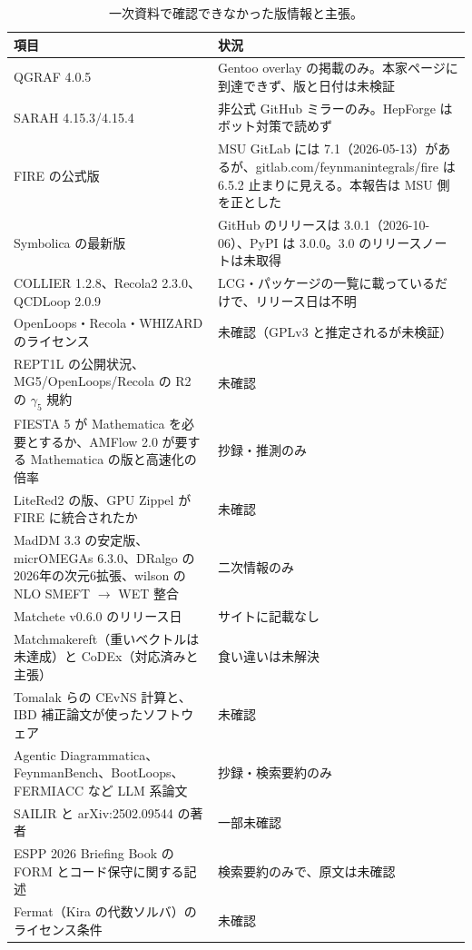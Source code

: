 \documentclass[a4paper,10pt]{ltjsarticle}
\begin{document}
\begin{table}[tbp]
\centering\small
\caption{一次資料で確認できなかった版情報と主張。}
\label{tab:unverified}
\begin{tabularx}{\linewidth}{>{\raggedright\arraybackslash\hsize=1.15\hsize}X>{\raggedright\arraybackslash\hsize=0.85\hsize}X}
\toprule
\textbf{項目} & \textbf{状況} \\
\midrule
QGRAF 4.0.5 & Gentoo overlay の掲載のみ。本家ページに到達できず、版と日付は未検証 \\
SARAH 4.15.3/4.15.4 & 非公式 GitHub ミラーのみ。HepForge はボット対策で読めず \\
FIRE の公式版 & MSU GitLab には 7.1（2026-05-13）があるが、gitlab.com/feynmanintegrals/fire は 6.5.2 止まりに見える。本報告は MSU 側を正とした \\
Symbolica の最新版 & GitHub のリリースは 3.0.1（2026-10-06）、PyPI は 3.0.0。3.0 のリリースノートは未取得 \\
COLLIER 1.2.8、Recola2 2.3.0、QCDLoop 2.0.9 & LCG・パッケージの一覧に載っているだけで、リリース日は不明 \\
OpenLoops・Recola・WHIZARD のライセンス & 未確認（GPLv3 と推定されるが未検証） \\
REPT1L の公開状況、MG5/OpenLoops/Recola の R2 の $\gamma_5$ 規約 & 未確認 \\
FIESTA 5 が Mathematica を必要とするか、AMFlow 2.0 が要する Mathematica の版と高速化の倍率 & 抄録・推測のみ \\
LiteRed2 の版、GPU Zippel が FIRE に統合されたか & 未確認 \\
MadDM 3.3 の安定版、micrOMEGAs 6.3.0、DRalgo の2026年の次元6拡張、wilson の NLO SMEFT $\to$ WET 整合 & 二次情報のみ \\
Matchete v0.6.0 のリリース日 & サイトに記載なし \\
Matchmakereft（重いベクトルは未達成）と CoDEx（対応済みと主張） & 食い違いは未解決 \\
Tomalak らの CEvNS 計算と、IBD 補正論文が使ったソフトウェア & 未確認 \\
Agentic Diagrammatica、FeynmanBench、BootLoops、FERMIACC など LLM 系論文 & 抄録・検索要約のみ \\
SAILIR と arXiv:2502.09544 の著者 & 一部未確認 \\
ESPP 2026 Briefing Book の FORM とコード保守に関する記述 & 検索要約のみで、原文は未確認 \\
Fermat（Kira の代数ソルバ）のライセンス条件 & 未確認 \\
\bottomrule
\end{tabularx}
\end{table}
\end{document}
